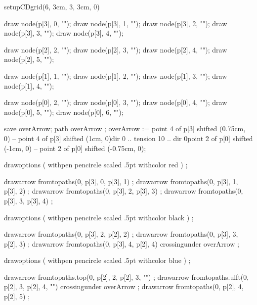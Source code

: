 
\usemodule[commDiag]

\startMPpage

setupCDgrid(6, 3cm, 3, 3cm, 0)


draw node(p[3], 0, "");
draw node(p[3], 1, "");
draw node(p[3], 2, "");
draw node(p[3], 3, "");
draw node(p[3], 4, "");

draw node(p[2], 2, "");
draw node(p[2], 3, "");
draw node(p[2], 4, "");
draw node(p[2], 5, "");

draw node(p[1], 1, "");
draw node(p[1], 2, "");
draw node(p[1], 3, "");
draw node(p[1], 4, "");

draw node(p[0], 2, "");
draw node(p[0], 3, "");
draw node(p[0], 4, "");
draw node(p[0], 5, "");
draw node(p[0], 6, "");



save overArrow; path overArrow ;
overArrow :=
  point 4 of p[3] shifted (0.75cm, 0) --
  point 4 of p[3] shifted (1cm, 0){dir 0} ..
  tension 10 ..
  {dir 0}point 2 of p[0] shifted (-1cm, 0) --
  point 2 of p[0] shifted (-0.75cm, 0);


drawoptions (
  withpen pencircle scaled .5pt
  withcolor red
) ;
  
drawarrow fromtopaths(0, p[3], 0, p[3], 1) ;
drawarrow fromtopaths(0, p[3], 1, p[3], 2) ;
drawarrow fromtopaths(0, p[3], 2, p[3], 3) ;
drawarrow fromtopaths(0, p[3], 3, p[3], 4) ;

drawoptions (
  withpen pencircle scaled .5pt
  withcolor black
) ;

drawarrow fromtopaths(0, p[3], 2, p[2], 2) ;
drawarrow fromtopaths(0, p[3], 3, p[2], 3) ;
drawarrow fromtopaths(0, p[3], 4, p[2], 4) crossingunder overArrow ;

drawoptions (
  withpen pencircle scaled .5pt
  withcolor blue
) ;

drawarrow fromtopaths.top(0, p[2], 2, p[2], 3, "") ;
drawarrow fromtopaths.ulft(0, p[2], 3, p[2], 4, "") crossingunder overArrow ;
drawarrow fromtopaths(0, p[2], 4, p[2], 5) ;

